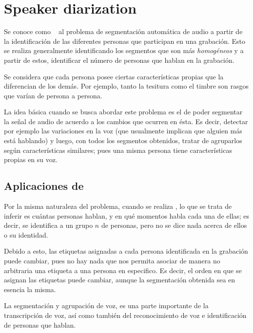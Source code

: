 
\chapter{Speaker diarization} \label{ch:chap2}

 
Se conoce como \SD~ al problema de segmentación automática de audio a partir de la identificación de las diferentes personas que participan en una grabación. Esto se realiza generalmente identificando los segmentos que son más \textit{homogéneos} y a partir de estos, identificar el número de personas que hablan en la grabación.

Se considera que cada persona posee ciertas características propias que la diferencian de los demás. Por ejemplo, tanto la tesitura como el timbre son rasgos que varían de persona a persona.

La idea básica cuando se busca abordar este problema es el de poder segmentar la señal de audio de acuerdo a los cambios que ocurren en ésta. Es decir, detectar por ejemplo las variaciones en la voz (que usualmente implican que alguien más está hablando) y luego, con todos los segmentos obtenidos, tratar de agruparlos según características similares; pues una misma persona tiene características propias en su voz. 

\section{Aplicaciones de \sd}

Por la misma naturaleza del problema, cuando se realiza \sd, lo que se trata de inferir es cuántas personas hablan, y en qué momentos habla cada una de ellas; es decir, se identifica a un grupo $n$ de personas, pero no se dice nada acerca de ellos o su identidad. 

Debido a esto, las etiquetas asignadas a cada persona identificada en la grabación puede cambiar, pues no hay nada que nos permita asociar de manera no arbitraria una etiqueta a una persona en especifico. Es decir, el orden en que se asignan las etiquetas puede cambiar, aunque la segmentación obtenida sea en esencia la misma.

La segmentación y agrupación de voz, es una parte importante de la transcripción de voz, así como también del reconocimiento de voz e identificación de personas que hablan. 

